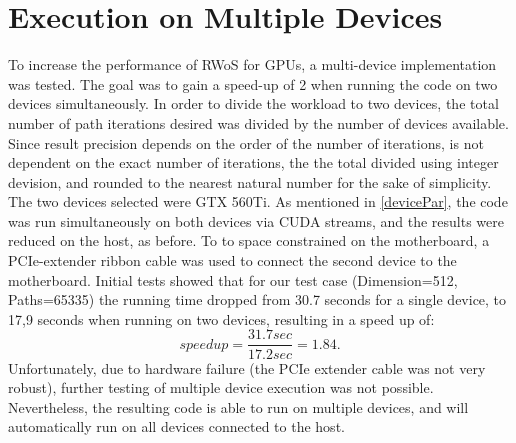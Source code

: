 \section{Execution on Multiple Devices}
To increase the performance of \Gls{RWoS} for \Glspl{GPU}, a multi-device implementation
was tested.  The goal was to gain a speed-up of 2 when running the code on two devices
simultaneously.  In order to divide the workload to two devices, the total number
of path iterations desired was divided by the number of devices available. Since
result precision depends on the order of the number of iterations, is not dependent
on the exact number of iterations, the the total divided using integer devision,
and rounded to the nearest natural number for the sake of simplicity.  The two
devices selected were GTX 560Ti. As mentioned in \ref{devicePar}, the code
was run simultaneously on both devices via CUDA streams, and the results were reduced
on the host, as before. To to space constrained on the motherboard, a PCIe-extender
ribbon cable was used to connect the second device to the motherboard. Initial tests
showed that for our test case (Dimension=512, Paths=65335) the running time dropped from
30.7 seconds for a single device, to 17,9 seconds when running on two devices,
resulting in a speed up of: $$ speedup = \frac{31.7 sec}{17.2 sec} = 1.84.$$ Unfortunately,
due to hardware failure (the PCIe extender cable was not very robust), further testing
of multiple device execution was not possible.  Nevertheless, the resulting code
is able to run on multiple devices, and will automatically run on all devices connected
to the host.

